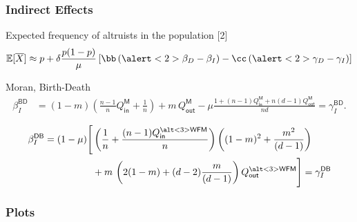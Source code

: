\documentclass[]{beamer}
\begin{document}
\subsubsection{Indirect Effects}
\begin{frame}{Expected frequency of altruists in the population [2]}
\vspace{-1em}
\begin{displaymath}
\mathbb{E}[\overline{X}] \approx p + \delta \frac{p (1-p)}{\mu}  \left[ \bb \left( \alert<2>{\beta_D} - \beta_I \right) - \cc \left( \alert<2>{\gamma_D} - \gamma_I \right) \right]
\end{displaymath}


\def \Moran {\mathsf{M}}
\def \BD {\mathsf{BD}}
\def \indirect {I}
\def \direct {D}
\def \Qin {Q_{\mathsf{in}}}
\def \Qout {Q_{\mathsf{out}}}
\def \DB {\mathsf{DB}}
\def \WF {\mathsf{WF}}

\pause
\begin{block}{Moran, Birth-Death}
{\footnotesize
\begin{displaymath}
\begin{split}
\beta_{\indirect}^{\BD} &=  (1-m) \left(\frac{n-1}{n} \Qin^{\Moran} + \frac{1}{n}\right) + m \, \Qout^{\Moran} %
- \mu \frac{ 1 + (n-1) \Qin^{\Moran} + n (d-1) \Qout^{\Moran}}{n d} = \gamma_{\indirect}^{\BD}.
\end{split}
\end{displaymath}
}
\end{block}

\begin{block}{}
{\footnotesize
\begin{displaymath}
\begin{split}
\beta_{\indirect}^{\DB} & = (1-\mu ) \Bigg[ \left( \frac{1}{n} + \frac{ (n-1) \Qin^{\alt<3>{\WF}{\Moran}} }{n} \right) \left( (1-m)^2 +  \frac{m^2}{ (d-1)} \right) \\ 
%
& \qquad \qquad \quad + m \, \left(2  (1-m) +  (d-2) \frac{m}{(d-1)}\right) \Qout^{\alt<3>{\WF}{\Moran}} \Bigg]  = \gamma_{\indirect}^{\DB}
%
\end{split}
\end{displaymath}
}
\end{block}

\end{frame}

\subsubsection{Plots}
\def \wpic {3.5cm}
\end{document}
